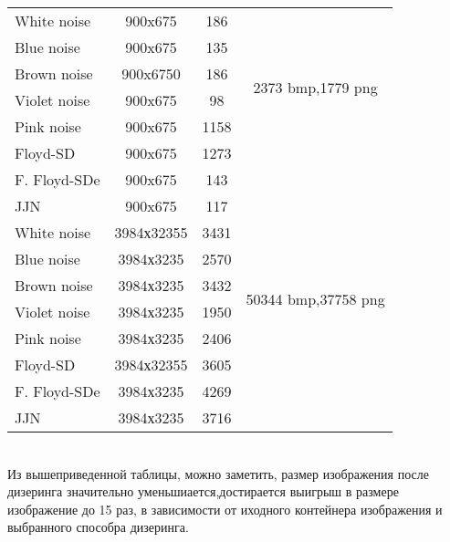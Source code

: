 \begin{tabular}{|@{\hspace*{2mm}}l||*{3}{c|}}\hline
	
	&\makebox[8em]{Разрешение, пикс}&\makebox[5em]{Размер, кб} &\makebox[7em]{Исх. раз., кб}
	\\\hline\hline
	White noise&900x675&186&\multirow{6}{*}{2373 bmp,1779 png} \\\cline{1-3}
	Blue noise& 900x675&135& \\\cline{1-3}
	Brown noise&900x6750&186&\\\cline{1-3}
	Violet noise &900x675&98&\\\cline{1-3}
	Pink noise &900x675&1158&\\\cline{1-3}
	Floyd-SD& 900x675&1273&\\\cline{1-3}
	F. Floyd-SDe&900x675&143&\\\cline{1-3}
	JJN &900x675&117&\\\hline
	White noise&3984х32355&3431&\multirow{6}{*}{50344 bmp,37758 png} \\\cline{1-3}
	Blue noise& 3984х3235&2570& \\\cline{1-3}
	Brown noise&3984х3235&3432&\\\cline{1-3}
	Violet noise &3984х3235&1950&\\\cline{1-3}
	Pink noise &3984х3235&2406&\\\cline{1-3}
	Floyd-SD& 3984х32355&3605&\\\cline{1-3}
	F. Floyd-SDe&3984х3235&4269&\\\cline{1-3}
	JJN &3984х3235&3716&\\\hline
\end{tabular}
\bigskip
\\

Из вышеприведенной таблицы, можно заметить, размер изображения после дизеринга значительно уменьшиается,достирается выигрыш в размере изображение до 15 раз, в зависимости от иходного контейнера изображения и выбранного способра дизеринга.
